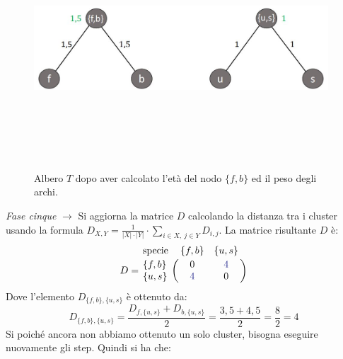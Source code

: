 \begin{figure}[h!]
\centering
	\includegraphics[height=9cm, width=11cm,keepaspectratio]{rooted_upgma_6.jpg}
 	\caption{Albero $T$ dopo aver calcolato l'età del nodo $\{f, b\}$ ed il peso degli archi.}
  	\label{fig:rooted_upgma_6}
\end{figure}
\newline
\newline
\textit{Fase cinque} $\rightarrow$ Si aggiorna la matrice $D$ calcolando la distanza tra i cluster usando la formula $D_{X,Y}=\frac{1}{\left | X \right |\cdot \left | Y \right |} \cdot \sum_{i\in X,\: j\in Y}D_{i,j}$. La matrice risultante $D$ è:
\[
D = \bordermatrix{\text{specie}&\{f, b\}&\{u, s\}\cr
                \{f, b\}& 0 & {\color{Blue} 4}\cr
                \{u, s\}& {\color{Blue} 4} & 0}
\]
Dove l'elemento $D_{\{f, b\}, \{u, s\}}$ è ottenuto da:
\[D_{\{f, b\}, \{u, s\}}=\frac{D_{f, \{u, s\}}+D_{b, \{u, s\}}}{2}=\frac{3,5+4,5}{2}=\frac{8}{2}=4\]
\newline
Si poiché ancora non abbiamo ottenuto un solo cluster, bisogna eseguire nuovamente gli step. Quindi si ha che:
